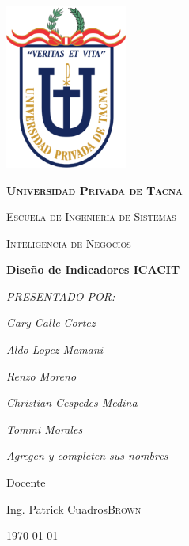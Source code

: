 \documentclass[12pt,a4paper]{report}
\begin{document}
\begin{titlepage}
	\centering
	\includegraphics[width=4cm]{./images/upt}\par\vspace{1cm}
	{\scshape\LARGE\huge\bfseries Universidad Privada de Tacna \par}
	{\scshape\LARGE Escuela de Ingenieria de Sistemas \par}
	\vspace{1cm}
	{\scshape\Large Inteligencia de Negocios\par}
	\vspace{0.5cm}
	{\huge\bfseries Diseño de Indicadores ICACIT\par}
	\vspace{1cm}

	{\Large\itshape PRESENTADO POR:\par}
	{\Large\itshape Gary Calle Cortez\par}
	{\Large\itshape Aldo Lopez Mamani\par}
	{\Large\itshape Renzo Moreno\par}
	{\Large\itshape Christian Cespedes Medina\par}
	{\Large\itshape Tommi Morales\par}
	{\Large\itshape Agregen y completen sus nombres\par}
	\vfill
	Docente\par
	Ing. Patrick Cuadros\textsc{Brown}

	\vfill

	{\large \today\par}

\end{titlepage}

\begin{abstract}
Esta es una plantilla simple para crear un articulo \LaTeX en español, con algunos comandos que se usarán frecuentemente para hacer tareas de la licenciatura en Física.
\end{abstract}
\end{document}
